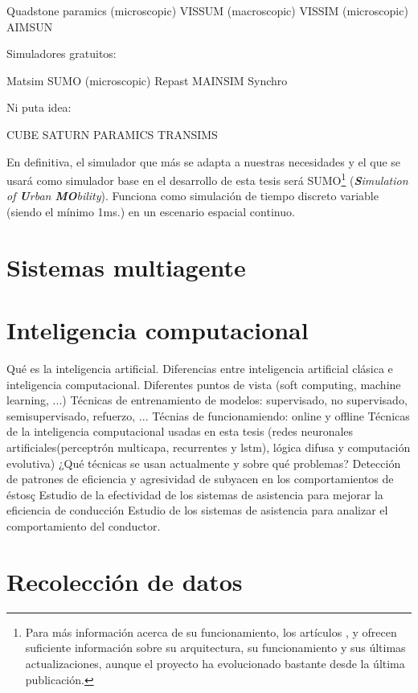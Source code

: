 Quadstone paramics (microscopic)
VISSUM (macroscopic)
VISSIM (microscopic)
AIMSUN

Simuladores gratuitos:

Matsim
SUMO (microscopic)
Repast
MAINSIM
Synchro

Ni puta idea:

CUBE
SATURN
PARAMICS
TRANSIMS

En definitiva, el simulador que más se adapta a nuestras necesidades y el que se usará como simulador base en el desarrollo de esta tesis será SUMO\footnote{Para más información acerca de su funcionamiento, los artículos \cite{krajzewicz2002sumo}, \cite{behrisch2011sumo} y \cite{krajzewicz2012recent} ofrecen suficiente información sobre su arquitectura, su funcionamiento y sus últimas actualizaciones, aunque el proyecto ha evolucionado bastante desde la última publicación.} (\textit{\textbf{S}imulation of \textbf{U}rban \textbf{MO}bility}). Funciona como simulación de tiempo discreto variable (siendo el mínimo 1ms.) en un escenario espacial continuo.


\section{Sistemas multiagente}


\section{Inteligencia computacional}

Qué es la inteligencia artificial.
Diferencias entre inteligencia artificial clásica e inteligencia computacional. Diferentes puntos de vista (soft computing, machine learning, ...)
Técnicas de entrenamiento de modelos: supervisado, no supervisado, semisupervisado, refuerzo, ...
Técnias de funcionamiendo: online y offline
Técnicas de la inteligencia computacional usadas en esta tesis (redes neuronales artificiales(perceptrón multicapa, recurrentes y lstm), lógica difusa y computación evolutiva)
¿Qué técnicas se usan actualmente y sobre qué problemas?
Detección de patrones de eficiencia y agresividad de subyacen en los comportamientos de éstosç
Estudio de la efectividad de los sistemas de asistencia para mejorar la eficiencia de conducción
Estudio de los sistemas de asistencia para analizar el comportamiento del conductor.

\section{Recolección de datos}



